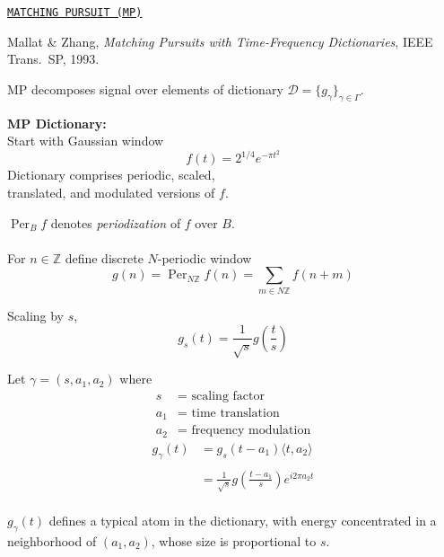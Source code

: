 \documentclass{slides}
\def\Z{\mathbb{Z}}    %
\def\WT{Wigner transform}
\begin{document}
\def\Per{\ensuremath{\operatorname{Per}}}
\begin{slide}%
\begin{center}{\tt \underline{MATCHING PURSUIT (MP)}}\end{center}
Mallat \& Zhang, {\it Matching Pursuits with Time-Frequency Dictionaries},
IEEE Trans.~SP, 1993.

MP decomposes signal over elements of dictionary 
$\mathcal{D}= \{g_\gamma\}_{\gamma\in\Gamma}$.

{\bf MP Dictionary:}\\
Start with Gaussian window 
\[
f(t) = 2^{1/4}e^{-\pi t^2}
\]
Dictionary comprises periodic, scaled, \\
translated, and modulated versions of $f$.
\end{slide}

\begin{slide}%
$\Per_{B}f$ denotes \emph{periodization} of $f$ over $B$.\\
\\
For $n \in \Z$ define discrete $N$-periodic window
\[
g(n) = \Per _{N\Z}f(n) = \sum_{m\in N\Z} f(n+m)
\]

Scaling by $s$,
\[
g_s(t) = \frac{1}{\sqrt{s}}g\left(\frac{t}{s}\right)
\]
\end{slide}
\begin{slide}%
Let $\gamma = (s, a_1, a_2)$ where
\begin{align*}
s &= \text{ scaling factor }\\
a_1 &= \text{ time translation}\\
a_2 &=\text{ frequency modulation}
\end{align*}
\begin{align*}
g_\gamma(t) &= g_s(t-a_1)\langle t,a_2 \rangle\\
\\
&= \frac{1}{\sqrt{s}}g\left(\frac{t-a_1}{s}\right) e^{i2\pi a_2 t}
\end{align*}
\\
$g_\gamma(t)$ defines a typical atom in the dictionary, with
energy %
concentrated in a neighborhood of $(a_1,a_2)$, whose size is proportional
to $s$.
\end{slide}
\end{document}
